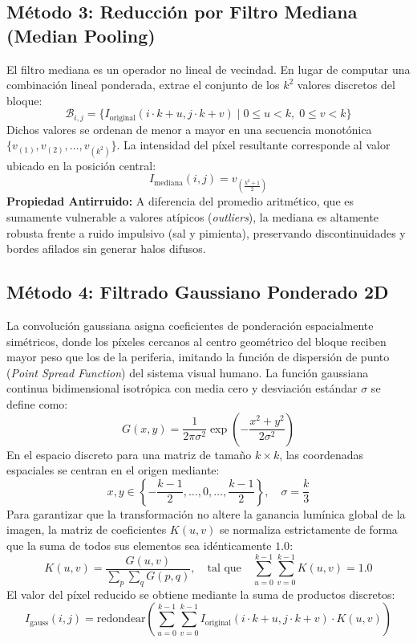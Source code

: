 \documentclass{article}
\begin{document}
\subsection{Método 3: Reducción por Filtro Mediana (Median Pooling)}
El filtro mediana es un operador no lineal de vecindad. En lugar de computar una combinación lineal ponderada, extrae el conjunto de los $k^2$ valores discretos del bloque:
\begin{equation}
    \mathcal{B}_{i, j} = \{ I_{\text{original}}(i \cdot k + u, j \cdot k + v) \mid 0 \le u < k, \; 0 \le v < k \}
\end{equation}
Dichos valores se ordenan de menor a mayor en una secuencia monotónica $\{v_{(1)}, v_{(2)}, \dots, v_{(k^2)}\}$. La intensidad del píxel resultante corresponde al valor ubicado en la posición central:
\begin{equation}
    \label{eq:mediana}
    I_{\text{mediana}}(i, j) = v_{\left( \frac{k^2 + 1}{2} \right)}
\end{equation}
\textbf{Propiedad Antirruido:} A diferencia del promedio aritmético, que es sumamente vulnerable a valores atípicos (\textit{outliers}), la mediana es altamente robusta frente a ruido impulsivo (sal y pimienta), preservando discontinuidades y bordes afilados sin generar halos difusos.

\subsection{Método 4: Filtrado Gaussiano Ponderado 2D}
La convolución gaussiana asigna coeficientes de ponderación espacialmente simétricos, donde los píxeles cercanos al centro geométrico del bloque reciben mayor peso que los de la periferia, imitando la función de dispersión de punto (\textit{Point Spread Function}) del sistema visual humano. La función gaussiana continua bidimensional isotrópica con media cero y desviación estándar $\sigma$ se define como:
\begin{equation}
    G(x, y) = \frac{1}{2\pi \sigma^2} \exp\left( -\frac{x^2 + y^2}{2\sigma^2} \right)
\end{equation}
En el espacio discreto para una matriz de tamaño $k \times k$, las coordenadas espaciales se centran en el origen mediante:
\begin{equation}
    x, y \in \left\{ -\frac{k-1}{2}, \dots, 0, \dots, \frac{k-1}{2} \right\}, \quad \sigma = \frac{k}{3}
\end{equation}
Para garantizar que la transformación no altere la ganancia lumínica global de la imagen, la matriz de coeficientes $K(u, v)$ se normaliza estrictamente de forma que la suma de todos sus elementos sea idénticamente $1.0$:
\begin{equation}
    K(u, v) = \frac{G(u, v)}{\sum_{p} \sum_{q} G(p, q)}, \quad \text{tal que} \quad \sum_{u=0}^{k-1} \sum_{v=0}^{k-1} K(u, v) = 1.0
\end{equation}
El valor del píxel reducido se obtiene mediante la suma de productos discretos:
\begin{equation}
    \label{eq:gauss}
    I_{\text{gauss}}(i, j) = \text{redondear}\left( \sum_{u=0}^{k-1} \sum_{v=0}^{k-1} I_{\text{original}}(i \cdot k + u, j \cdot k + v) \cdot K(u, v) \right)
\end{equation}
\end{document}
